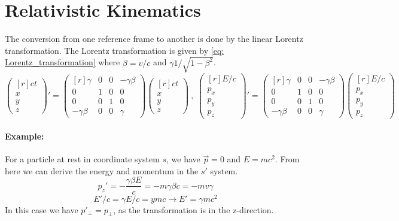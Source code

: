 \section{Relativistic Kinematics}
The conversion from one reference frame to another is done by the linear Lorentz transformation. The Lorentz transformation is given by \cref{eq: Lorentz_transformation} where $β = v / c$ and $γ 1 / \sqrt{1 - β^2}$. 
\begin{equation}\label{eq: Lorentz_transformation}
    \begin{pmatrix*}[r]
     ct \\
     x \\
     y \\
     z 
    \end{pmatrix*}' = 
    \begin{pmatrix*}[r]
     γ & 0 & 0 & -γβ \\
     0 & 1 & 0 & 0 \\
     0 & 0 & 1 & 0 \\
     -γβ & 0 & 0 & γ 
    \end{pmatrix*} 
    \begin{pmatrix*}[r]
     ct \\
     x \\
     y \\
     z 
    \end{pmatrix*} \ , \ 
    \begin{pmatrix*}[r]
     E / c \\
     p_x \\
     p_y \\
     p_z 
    \end{pmatrix*}' = 
    \begin{pmatrix*}[r]
     γ & 0 & 0 & -γβ \\
     0 & 1 & 0 & 0 \\
     0 & 0 & 1 & 0 \\
     -γβ & 0 & 0 & γ
    \end{pmatrix*}
    \begin{pmatrix*}[r]
     E / c \\
     p_x \\
     p_y \\
     p_z
    \end{pmatrix*}
\end{equation}
\paragraph{Example:}
For a particle at rest in coordinate system $s$, we have $\vec{p} = 0$ and $E = mc^2$. From here we can derive the energy and momentum in the $s'$ system.
\begin{equation}
  p_{z}' = - \frac{γβE}{c} = -mγβc = -mvγ
\end{equation}
\begin{equation}
  E' / c = γE / c = ymc → E' = γmc^2
\end{equation}
In this case we have $p'_{\perp} = p_{\perp}$, as the transformation is in the z-direction.

